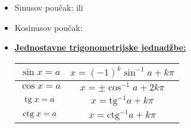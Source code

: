 \documentclass[10pt,oneside,a4paper]{report}
\begin{document}
\begin{itemize}
		\item \textsf{Sinusov pou\v{c}ak:}\hspace{5mm} 
		\hspace{3mm} ili \hspace{3mm}
		\item \textsf{Kosinusov pou\v{c}ak:} \hspace{1mm}
		 \\
		\hspace*{33mm}
		\hspace{7mm}
		\hspace{6mm}
	\item \textbf{\textsf{\underline{Jednostavne trigonometrijske jednad\v{z}be:}}}\\
		\hspace*{34mm}
		\begin{tabular}{c|c}
		$\sin x=a$ &  $x=(-1)^k\sin^{-1}a+k\pi$\\
		\hline
		$\cos x=a$ &  $x=\pm\cos^{-1}a+2k\pi$\\
		\hline
		$\textrm{tg}\hspace{1mm} x=a$ &  $x=\textrm{tg}^{-1}a+k\pi$\\
		\hline
		$\textrm{ctg}\hspace{1mm} x=a$ &  $x=\textrm{ctg}^{-1}a+k\pi$\\
		\end{tabular}
\end{itemize}
\hfill{}
\end{document}
